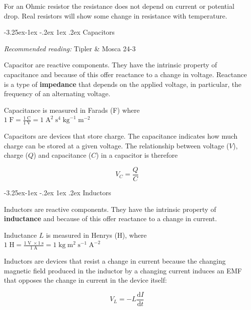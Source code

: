 \documentclass[
]{book}
\makeatletter
\renewcommand\subsection{%
\@startsection{subsection}{2}{\z@}%
              {-3.25ex\@plus -1ex \@minus -.2ex}%
              {1ex \@plus .2ex}%
              {\sffamily\bfseries}}
\numberwithin{equation}{section}
\makeatother
\begin{document}
For an Ohmic resistor the resistance does not depend on current or
potential drop. Real resistors will show some change in resistance with
temperature.

\hypertarget{capacitors}{%
\subsection{Capacitors}\label{capacitors}}

\emph{Recommended reading:} Tipler \& Mosca 24-3

Capacitor are reactive components. They have the intrinsic property of
capacitance and because of this offer reactance to a change in voltage.
Reactance is a type of \textbf{impedance} that depends on the applied
voltage, in particular, the frequency of an alternating voltage.

Capacitance is measured in Farads (F) where\\
\(1 \; \text{F} = \frac{1 \; \text{C}}{1 \; \text{V}} = 1 \; \text{A}^2 \; \text{s}^4 \; \text{kg}^{-1} \; \text{m}^{-2}\)

Capacitors are devices that store charge. The capacitance indicates how
much charge can be stored at a given voltage. The relationship between
voltage (\(V\)), charge (\(Q\)) and capacitance (\(C\)) in a capacitor is
therefore

\begin{equation}
\label{eq:Vcapacitor}
V_C = \frac{Q}{C}
\end{equation}

\hypertarget{inductors}{%
\subsection{Inductors}\label{inductors}}

Inductors are reactive components. They have the intrinsic property of
\textbf{inductance} and because of this offer reactance to a change in
current.

Inductance \(L\) is measured in Henrys (H), where\\
\(1 \; \text{H} = \frac{1 \; \text{V} \; \times 1 \; \text{s} } { 1 \; \text{A} } = 1 \; \text{kg} \; \text{m}^{2} \; \text{s}^{-1} \; \text{A}^{-2}\)

Inductors are devices that resist a change in current because the
changing magnetic field produced in the inductor by a changing current
induces an EMF that opposes the change in current in the device itself:

\begin{equation}
\label{eq:Vinductor}
V_L  = -L \frac{\mathrm{d} I}{\mathrm{d} t}
\end{equation}
\end{document}
